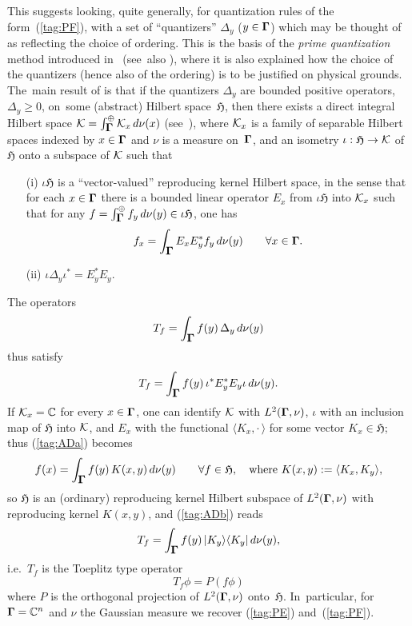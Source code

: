 \documentclass[11pt]{amsart}
\numberwithin{equation}{section}
\theoremstyle{remark}
\newcommand\spr[2]{\langle #1,#2\rangle}
\newcommand\into{\int_\Omg}
\newcommand\Omg{{\bigam}}   %
\newcommand\KK{{\Cal K}}
\newcommand\HH{\mathfrak H}
\newcommand{\CC}{\C}
\newcommand{\bigam}{\mbox{\boldmath $\Gamma$}}
\newcommand{\C}{\mathbb C}
\begin{document}
This suggests looking, quite generally, for quantization rules of the
form~(\ref{tag:PF}), with a set of ``quantizers'' $\Delta_y$ ($y\in\Omg$)
which may be thought of as reflecting the choice of ordering. This is the basis
of the {\sl prime quantization\/} method introduced in~\cite{bib:AliD}
(see~also \cite{bib:Prugo}), where it is also explained how the choice of the
quantizers (hence also of the ordering) is to be justified on physical grounds.
The~main result of \cite{bib:AliD} is that if the quantizers $\Delta_y$ are
bounded positive operators, $\Delta_y\ge0$, on~some (abstract) Hilbert
space~$\HH$, then there exists a direct integral Hilbert space
$\KK=\into^\oplus \KK_x \,d\nu(x)$ (see~\cite{bib:BratteliR}), where $\KK_x$ is
a family of separable Hilbert spaces indexed by $x\in\Omg$ and $\nu$ is a
measure on~$\Omg$, and an isometry $\iota:\HH\to\KK$ of $\HH$ onto a subspace
of $\KK$ such that
\begin{enumerate}
\item[(i)] $\iota\HH$ is a ``vector-valued'' reproducing kernel Hilbert space,
in the sense that for each $x\in\Omg$ there is a bounded linear operator
$E_x$ from $\iota\HH$ into $\KK_x$ such that for any $f=\into^\oplus f_y\,d\nu
(y) \in\iota\HH$, one has
\begin{equation}  f_x = \into E_x E_y^* f_y \, d\nu(y) \qquad \forall
x\in\Omg. \label{tag:ADa} \end{equation}
\item[(ii)] $\iota\Delta_y\iota^* = E_y^* E_y$.  \end{enumerate}
The operators
$$ T_f = \into f(y) \,\Delta_y \,d\nu(y)  $$
thus satisfy
\begin{equation}  T_f = \into f(y) \,\iota^* E^*_y E_y\iota \,d\nu(y).
\label{tag:ADb}  \end{equation}
If $\KK_x=\CC$ for every $x\in\Omg$, one can identify $\KK$ with
$L^2(\Omg,\nu)$, $\iota$ with an inclusion map of $\HH$ into $\KK$, and $E_x$
with the functional $\spr{K_x}{\cdot\,}$ for some vector $K_x\in\HH$; thus
(\ref{tag:ADa}) becomes
$$ f(x) = \into f(y) \, K(x,y) \,d\nu(y) \qquad\forall f\in\HH,
\text{ where }K(x,y):=\spr{K_x}{K_y},  $$
so $\HH$ is an (ordinary) reproducing kernel Hilbert subspace of
$L^2(\Omg,\nu)$ with reproducing kernel $K(x,y)$, and (\ref{tag:ADb}) reads
$$ T_f = \into f(y) \, \vert K_y\rangle\langle K_y \vert \,d\nu(y),  $$
i.e.~$T_f$ is the Toeplitz type operator
$$ T_f \phi = P(f\phi)   $$
where $P$ is the orthogonal projection of $L^2(\Omg,\nu)$ onto~$\HH$.
In~particular, for $\Omg=\CC^n$ and $\nu$ the Gaussian measure we recover
(\ref{tag:PE}) and~(\ref{tag:PF}).
\end{document}
